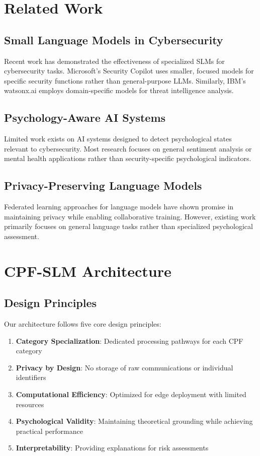 \documentclass[11pt,a4paper]{article}
\begin{document}
\section{Related Work}

\subsection{Small Language Models in Cybersecurity}

Recent work has demonstrated the effectiveness of specialized SLMs for cybersecurity tasks. Microsoft's Security Copilot uses smaller, focused models for specific security functions rather than general-purpose LLMs. Similarly, IBM's watsonx.ai employs domain-specific models for threat intelligence analysis.

\subsection{Psychology-Aware AI Systems}

Limited work exists on AI systems designed to detect psychological states relevant to cybersecurity. Most research focuses on general sentiment analysis or mental health applications rather than security-specific psychological indicators.

\subsection{Privacy-Preserving Language Models}

Federated learning approaches for language models have shown promise in maintaining privacy while enabling collaborative training. However, existing work primarily focuses on general language tasks rather than specialized psychological assessment.

\section{CPF-SLM Architecture}

\subsection{Design Principles}

Our architecture follows five core design principles:

\begin{enumerate}
\item \textbf{Category Specialization}: Dedicated processing pathways for each CPF category
\item \textbf{Privacy by Design}: No storage of raw communications or individual identifiers
\item \textbf{Computational Efficiency}: Optimized for edge deployment with limited resources
\item \textbf{Psychological Validity}: Maintaining theoretical grounding while achieving practical performance
\item \textbf{Interpretability}: Providing explanations for risk assessments
\end{enumerate}
\end{document}
